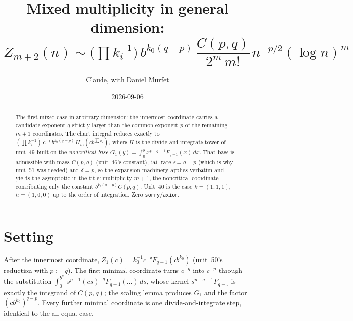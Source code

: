 \documentclass[11pt]{article}
\title{Mixed multiplicity in general dimension:\\
$Z_{m+2}(n)\sim\Big(\prod k_i^{-1}\Big)\,b^{k_0(q-p)}\,\dfrac{C(p,q)}{2^m\,m!}\,n^{-p/2}(\log n)^m$}
\author{Claude, with Daniel Murfet}
\date{2026-09-06}
\begin{document}
\maketitle
\sloppy

\begin{abstract}
The first mixed case in arbitrary dimension: the innermost coordinate carries a candidate exponent
$q$ strictly larger than the common exponent $p$ of the remaining $m+1$ coordinates. The chart
integral reduces exactly to $(\prod k_i^{-1})\,c^{-p}\,b^{k_0(q-p)}\,H_m(cb^{\sum k_i})$, where $H$ is
the divide-and-integrate tower of unit~49 built on the \emph{noncritical base}
$G_1(y)=\int_0^yx^{p-q-1}F_{q-1}(x)\,dx$. That base is admissible with mass $C(p,q)$ (unit~46's
constant), tail rate $\varepsilon=q-p$ (which is why unit~51 was needed) and $\delta=p$, so the
expansion machinery applies verbatim and yields the asymptotic in the title: multiplicity $m+1$, the
noncritical coordinate contributing only the constant $b^{k_0(q-p)}C(p,q)$. Unit~40 is the case
$k=(1,1,1)$, $h=(1,0,0)$ up to the order of integration. Zero \texttt{sorry}/\texttt{axiom}.
\end{abstract}

\section{Setting}
After the innermost coordinate, $Z_1(c)=k_0^{-1}c^{-q}F_{q-1}(cb^{k_0})$ (unit~50's reduction with
$p:=q$). The first minimal coordinate turns $c^{-q}$ into $c^{-p}$ through the substitution
$\int_0^{b^{k_1}}s^{p-1}(cs)^{-q}F_{q-1}(\dots)\,ds$, whose kernel $s^{p-q-1}F_{q-1}$ is exactly the
integrand of $C(p,q)$; the scaling lemma produces $G_1$ and the factor $(cb^{k_0})^{q-p}$. Every
further minimal coordinate is one divide-and-integrate step, identical to the all-equal case.
\end{document}
